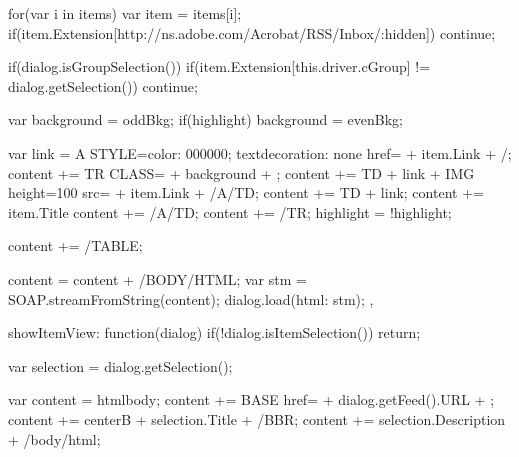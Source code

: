 \documentclass[letterpaper,12pt,english,openany,oneside]{sphinxmanual}
\begin{document}
\begin{sphinxVerbatim}[commandchars=\\\{\}]
                   for(var i in items)
                   \PYGZob{}
                       var item = items[i];
   if(item.Extension[\PYGZdq{}http://ns.adobe.com/Acrobat/RSS/Inbox/:hidden\PYGZdq{}])
                               continue;

                       if(dialog.isGroupSelection())
                       \PYGZob{}
   if(item.Extension[this.driver.cGroup] != dialog.getSelection())
                               continue;
                       \PYGZcb{}

                       var background = \PYGZdq{}oddBkg\PYGZdq{};
                       if(highlight) background = \PYGZdq{}evenBkg\PYGZdq{};

                       var link = \PYGZdq{}\PYGZlt{}A STYLE=\PYGZdq{}color: \PYGZsh{}000000;
                           text\PYGZhy{}decoration: none\PYGZdq{} href=\PYGZdq{}\PYGZdq{} +
                           item.Link + \PYGZdq{}\PYGZdq{}/\PYGZgt{}\PYGZdq{};
                       content += \PYGZdq{}\PYGZlt{}TR CLASS=\PYGZdq{}\PYGZdq{} + background + \PYGZdq{}\PYGZdq{}\PYGZgt{}\PYGZdq{};
                       content += \PYGZdq{}\PYGZlt{}TD\PYGZgt{}\PYGZdq{} + link + \PYGZdq{}\PYGZlt{}IMG height=100 src=\PYGZdq{}\PYGZdq{} +
                           item.Link + \PYGZdq{}\PYGZdq{}\PYGZgt{}\PYGZlt{}/A\PYGZgt{}\PYGZlt{}/TD\PYGZgt{}\PYGZdq{};
                       content += \PYGZdq{}\PYGZlt{}TD\PYGZgt{}\PYGZdq{} + link;
                       content += item.Title
                       content += \PYGZdq{}\PYGZlt{}/A\PYGZgt{}\PYGZlt{}/TD\PYGZgt{}\PYGZdq{};
                       content += \PYGZdq{}\PYGZlt{}/TR\PYGZgt{}\PYGZdq{};
                       highlight = !highlight;
                   \PYGZcb{}

                   content += \PYGZdq{}\PYGZlt{}/TABLE\PYGZgt{}\PYGZdq{};
               \PYGZcb{}

               content = content + \PYGZdq{}\PYGZlt{}/BODY\PYGZgt{}\PYGZlt{}/HTML\PYGZgt{}\PYGZdq{};
               var stm = SOAP.streamFromString(content);
               dialog.load(\PYGZob{}\PYGZdq{}html\PYGZdq{}: stm\PYGZcb{});
           \PYGZcb{},

           showItemView: function(dialog)
           \PYGZob{}
               if(!dialog.isItemSelection()) return;

               var selection = dialog.getSelection();

               var content = \PYGZdq{}\PYGZlt{}html\PYGZgt{}\PYGZlt{}body\PYGZgt{}\PYGZdq{};
               content += \PYGZdq{}\PYGZlt{}BASE href=\PYGZdq{}\PYGZdq{} + dialog.getFeed().URL + \PYGZdq{}\PYGZdq{}\PYGZgt{}\PYGZdq{};
               content += \PYGZdq{}\PYGZlt{}center\PYGZgt{}\PYGZlt{}B\PYGZgt{}\PYGZdq{} + selection.Title + \PYGZdq{}\PYGZlt{}/B\PYGZgt{}\PYGZlt{}BR\PYGZgt{}\PYGZdq{};
               content += selection.Description + \PYGZdq{}\PYGZlt{}/body\PYGZgt{}\PYGZlt{}/html\PYGZgt{}\PYGZdq{};


\end{sphinxVerbatim}
\end{document}
